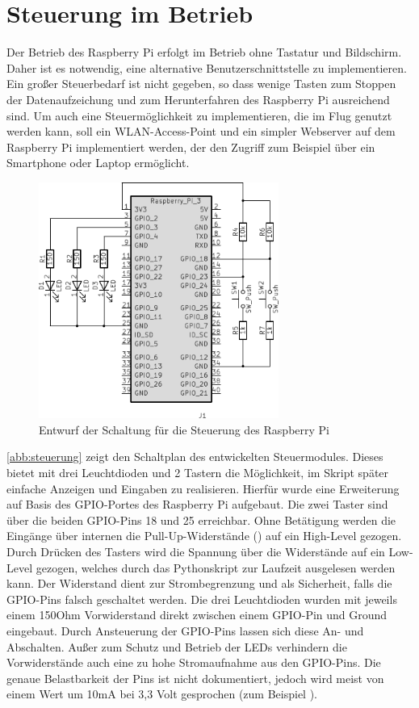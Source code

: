 \documentclass[a4paper,12pt,bibliography=totoc, listof=totoc,titlepage,pointlessnumbers]{scrreprt}
\begin{document}
\section{Steuerung im Betrieb}
\label{s:steuermodul}
Der Betrieb des Raspberry Pi erfolgt im Betrieb ohne Tastatur und Bildschirm. Daher ist es notwendig, eine alternative Benutzerschnittstelle zu implementieren. Ein großer Steuerbedarf ist nicht gegeben, so dass wenige Tasten zum Stoppen der Datenaufzeichung und zum Herunterfahren des Raspberry Pi ausreichend sind. Um auch eine Steuermöglichkeit zu implementieren, die im Flug genutzt werden kann, soll ein WLAN-Access-Point und ein simpler Webserver auf dem Raspberry Pi implementiert werden, der den Zugriff zum Beispiel über ein Smartphone oder Laptop ermöglicht.

\begin{figure}
 \centering
 \includegraphics[width=0.7\textwidth]{img/schaltplanRasp.pdf}
 \caption{Entwurf der Schaltung für die Steuerung des Raspberry Pi}
 \label{abb:steuerung}
\end{figure}

\autoref{abb:steuerung} zeigt den Schaltplan des entwickelten Steuermodules. Dieses bietet mit drei Leuchtdioden und 2 Tastern die Möglichkeit, im Skript später einfache Anzeigen und Eingaben zu realisieren. Hierfür wurde eine Erweiterung auf Basis des GPIO-Portes des Raspberry Pi aufgebaut. Die zwei Taster sind über die beiden GPIO-Pins 18 und 25 erreichbar. Ohne Betätigung werden die Eingänge über internen die Pull-Up-Widerstände () auf ein High-Level gezogen. Durch Drücken des Tasters wird die Spannung über die Widerstände  auf ein Low-Level gezogen, welches durch das Pythonskript zur Laufzeit ausgelesen werden kann. Der Widerstand  dient zur Strombegrenzung und als Sicherheit, falls die GPIO-Pins falsch geschaltet werden.
Die drei Leuchtdioden wurden mit jeweils einem 150Ohm Vorwiderstand direkt zwischen einem GPIO-Pin und Ground eingebaut. Durch Ansteuerung der GPIO-Pins lassen sich diese An- und Abschalten. Außer zum Schutz und Betrieb der LEDs verhindern die Vorwiderstände auch eine zu hohe Stromaufnahme aus den GPIO-Pins. Die genaue Belastbarkeit der Pins ist nicht dokumentiert, jedoch wird meist von einem Wert um 10mA bei 3,3 Volt gesprochen (zum Beispiel \citet{ekRaspPin}).
\end{document}
